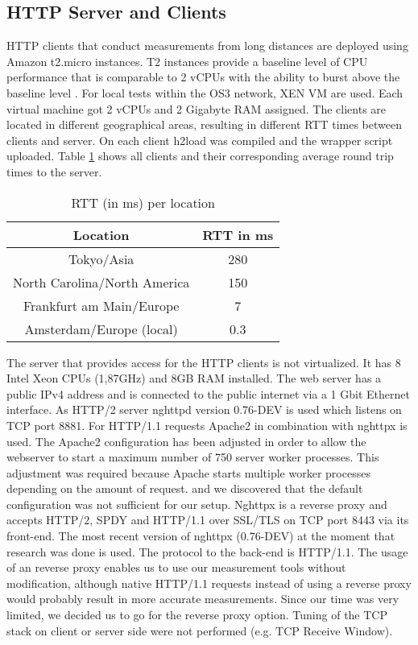 \subsection{HTTP Server and Clients}
\label{subsec:server_client}
HTTP clients that conduct measurements from long distances are deployed using Amazon t2.micro instances. T2 instances provide a baseline level of CPU performance that is comparable to 2 vCPUs with the ability to burst above the baseline level \cite{amazon-ts}. For local tests within the OS3 network, XEN VM are used. Each virtual machine got 2 vCPUs and 2 Gigabyte RAM assigned. The clients are located in different geographical areas, resulting in different RTT times between clients and server. On each client h2load was compiled and the wrapper script uploaded. Table \ref{table:locations} shows all clients and their corresponding average round trip times to the server.

\begin{table}[h]
	\centering
\begin{tabular}{ | c | c | }

\hline
\textbf{Location} & \textbf{RTT in ms}\\ \hline \hline
Tokyo/Asia &  280\\ \hline
North Carolina/North America &  150\\ \hline 
Frankfurt am Main/Europe &  7\\ \hline
Amsterdam/Europe (local) &  0.3\\

\hline
\end{tabular}
\caption{RTT (in ms) per location}
\label{table:locations}
\end{table}

The server that provides access for the HTTP clients is not virtualized. It has 8 Intel Xeon CPUs (1,87GHz) and 8GB RAM installed. The web server has a public IPv4 address and is connected to the public internet via a 1 Gbit Ethernet interface. As HTTP/2 server nghttpd \cite{nghttp} version 0.76-DEV is used which listens on TCP port 8881. For HTTP/1.1 requests Apache2 \cite{apache2} in combination with nghttpx \cite{nghttpx} is used. The Apache2 configuration has been adjusted in order to allow the webserver to start a maximum number of 750 server worker processes. This adjustment was required because Apache starts multiple worker processes depending on the amount of request. and we discovered that the default configuration was not sufficient for our setup. Nghttpx is a reverse proxy and accepts HTTP/2, SPDY and HTTP/1.1 over SSL/TLS on TCP port 8443 via its front-end. The most recent version of nghttpx (0.76-DEV) at the moment that research was done is used. The protocol to the back-end is HTTP/1.1. The usage of an reverse proxy enables us to use our measurement tools without modification, although native HTTP/1.1 requests instead of using a reverse proxy would probably result in more accurate measurements. Since our time was very limited, we decided us to go for the reverse proxy option.
Tuning of the TCP stack on client or server side were not performed (e.g. TCP Receive Window).
